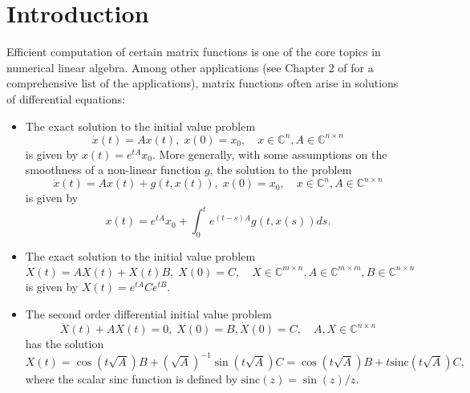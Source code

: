 \section{Introduction}

Efficient computation of certain matrix functions is one of the core topics in numerical linear
algebra. Among other applications (see Chapter 2 of \cite{higham2008functions} for a
comprehensive list of the applications), matrix functions often arise in solutions of
differential equations:
\begin{itemize}
    \item The exact solution to the initial value problem
        \begin{equation*}
            \dot{x}(t) = A x(t), \; x(0) = x_0, \quad x \in \mathbb{C}^{n}, A \in \mathbb{C}^{n \times n}
        \end{equation*}
        is given by $x(t) = e^{tA} x_0$. More generally, with some assumptions on the smoothness
        of a non-linear function $g$, the solution to the problem
        \begin{equation}
            \label{eq:exponentialintegratorproblem}
            \dot{x}(t) = A x(t) + g(t, x(t)), \; x(0) = x_0, \quad x \in \mathbb{C}^{n}, A \in \mathbb{C}^{n \times n}
        \end{equation}
        is given by
        \begin{equation}
            \label{eq:exponentialintegratorsolution}
            x(t) = e^{tA} x_0 + \int_{0}^{t}{e^{(t-s)A} g(t, x(s)) ds}.
        \end{equation}

    \item The exact solution to the initial value problem
    \begin{equation*}
        \dot{X}(t) = A X(t) + X(t) B, \; X(0) = C, \quad X \in \mathbb{C}^{m \times n}, A \in \mathbb{C}^{m \times m}, B \in \mathbb{C}^{n \times n}
    \end{equation*}
    is given by $X(t) = e^{tA} C e^{tB}$.

    \item The second order differential initial value problem
    \begin{equation*}
        \ddot{X}(t) + A X(t) = 0, \; X(0) = B, \dot{X}(0) = C, \quad A, X \in \mathbb{C}^{n \times n}
    \end{equation*}
    has the solution
    \begin{equation*}
        X(t) = \cos(t \sqrt{A}) B + (\sqrt{A})^{-1} \sin(t \sqrt{A}) C
        = \cos(t \sqrt{A}) B + t \mathrm{sinc}(t \sqrt{A}) C,
    \end{equation*}
    where the scalar sinc function is defined by $\mathrm{sinc}(z) = \sin(z) / z$.
\end{itemize}

